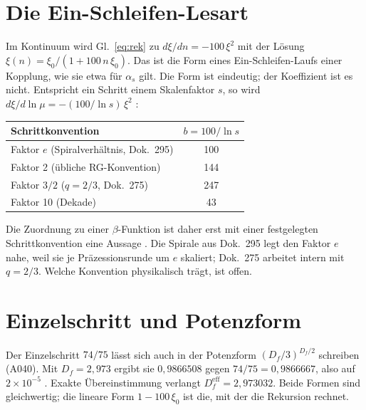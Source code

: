 \section{Die Ein-Schleifen-Lesart}

Im Kontinuum wird Gl.~\eqref{eq:rek} zu $d\xi/dn=-100\,\xi^2$ mit der Lösung
$\xi(n)=\xi_0/(1+100\,n\,\xi_0)$. Das ist die Form eines Ein-Schleifen-Laufs einer
Kopplung, wie sie etwa für $\alpha_s$ gilt. Die Form ist eindeutig; der
Koeffizient ist es nicht. Entspricht ein Schritt einem Skalenfaktor $s$, so wird
$d\xi/d\ln\mu=-(100/\ln s)\,\xi^2$ \KM:

\begin{center}
\begin{tabular}{lc}
\toprule
Schrittkonvention & $b=100/\ln s$ \\
\midrule
Faktor $e$ (Spiralverhältnis, Dok.~295) & 100 \\
Faktor 2 (übliche RG-Konvention) & 144 \\
Faktor $3/2$ ($q=2/3$, Dok.~275) & 247 \\
Faktor 10 (Dekade) & 43 \\
\bottomrule
\end{tabular}
\end{center}

Die Zuordnung zu einer $\beta$-Funktion ist daher erst mit einer festgelegten
Schrittkonvention eine Aussage \SM. Die Spirale aus Dok.~295 legt den Faktor $e$
nahe, weil sie je Präzessionsrunde um $e$ skaliert; Dok.~275 arbeitet intern mit
$q=2/3$. Welche Konvention physikalisch trägt, ist offen.

\section{Einzelschritt und Potenzform}

Der Einzelschritt $74/75$ lässt sich auch in der Potenzform $(D_f/3)^{D_f/2}$
schreiben (A040). Mit $D_f=2{,}973$ ergibt sie $0{,}9866508$ gegen
$74/75=0{,}9866667$, also auf $2\times10^{-5}$ \KM. Exakte Übereinstimmung verlangt
$D_f^\text{eff}=2{,}973032$. Beide Formen sind gleichwertig; die lineare Form
$1-100\,\xi_0$ ist die, mit der die Rekursion rechnet.

